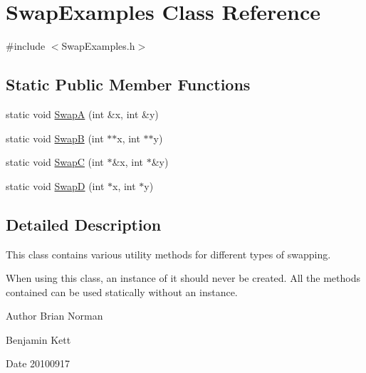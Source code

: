 \hypertarget{classSwapExamples}{
\section{SwapExamples Class Reference}
\label{classSwapExamples}
}


{\ttfamily \#include $<$SwapExamples.h$>$}

\subsection*{Static Public Member Functions}
\begin{DoxyCompactItemize}
\item 
static void \hyperlink{classSwapExamples_a5f1db10656b5afe7efffa4e7df9ad36f}{SwapA} (int \&x, int \&y)
\item 
static void \hyperlink{classSwapExamples_aa8f171680c769038e041cdd95e34115a}{SwapB} (int $\ast$$\ast$x, int $\ast$$\ast$y)
\item 
static void \hyperlink{classSwapExamples_a44e958009befa1f49bf80968ca401f45}{SwapC} (int $\ast$\&x, int $\ast$\&y)
\item 
static void \hyperlink{classSwapExamples_a50e369332f53d06620e82f195baa1f5a}{SwapD} (int $\ast$x, int $\ast$y)
\end{DoxyCompactItemize}


\subsection{Detailed Description}
This class contains various utility methods for different types of swapping.

When using this class, an instance of it should never be created. All the methods contained can be used statically without an instance.

\begin{DoxyAuthor}{Author}
Brian Norman 

Benjamin Kett
\end{DoxyAuthor}
\begin{DoxyDate}{Date}
20100917 
\end{DoxyDate}


